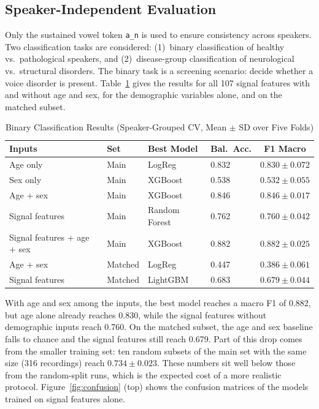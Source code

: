 \documentclass[runningheads]{llncs}
\begin{document}
  \subsection{Speaker-Independent Evaluation}

  Only the sustained vowel token \texttt{a\_n} is used to ensure consistency across speakers. Two classification tasks are considered: (1)~binary classification of healthy vs.\ pathological speakers, and (2)~disease-group classification of neurological vs.\ structural disorders. The binary task is a screening scenario: decide whether a voice disorder is present. Table~\ref{tab:binary_results} gives the results for all 107 signal features with and without age and sex, for the demographic variables alone, and on the matched subset.

  \begin{table}[htbp]
  \centering
  \caption{Binary Classification Results (Speaker-Grouped CV, Mean $\pm$ SD over Five Folds)}
  \label{tab:binary_results}
  \begin{tabular}{llllc}
  \toprule
  \textbf{Inputs} & \textbf{Set} & \textbf{Best Model} & \textbf{Bal.\ Acc.} & \textbf{F1 Macro} \\
  \midrule
  Age only & Main & LogReg & 0.832 & $0.830 \pm 0.072$ \\
  Sex only & Main & XGBoost & 0.538 & $0.532 \pm 0.055$ \\
  Age + sex & Main & XGBoost & 0.846 & $0.846 \pm 0.017$ \\
  Signal features & Main & Random Forest & 0.762 & $0.760 \pm 0.042$ \\
  Signal features + age + sex & Main & XGBoost & 0.882 & $\mathbf{0.882 \pm 0.025}$ \\
  \midrule
  Age + sex & Matched & LogReg & 0.447 & $0.386 \pm 0.061$ \\
  Signal features & Matched & LightGBM & 0.683 & $\mathbf{0.679 \pm 0.044}$ \\
  \bottomrule
  \end{tabular}
  \end{table}

  With age and sex among the inputs, the best model reaches a macro F1 of 0.882, but age alone already reaches 0.830, while the signal features without demographic inputs reach 0.760. On the matched subset, the age and sex baseline falls to chance and the signal features still reach 0.679. Part of this drop comes from the smaller training set: ten random subsets of the main set with the same size (316 recordings) reach $0.734 \pm 0.023$. These numbers sit well below those from the random-split runs, which is the expected cost of a more realistic protocol. Figure~\ref{fig:confusion} (top) shows the confusion matrices of the models trained on signal features alone.
\end{document}
